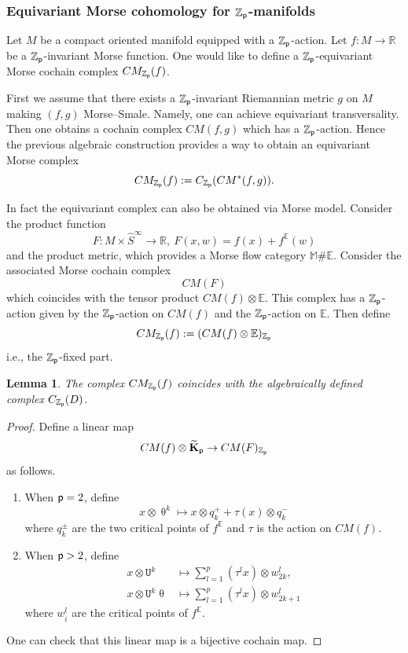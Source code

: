 \documentclass[reqno, 10pt]{amsart}
\numberwithin{equation}{section}
\numberwithin{equation}{section}
\newtheorem{lemma}[thm]{Lemma}
\theoremstyle{definition}
\theoremstyle{remark}
\newcommand{\beqn}{\begin{equation*}}
\newcommand{\eeqn}{\end{equation*}}
\newcommand{\mb}{\mathbb}
\newcommand{\p}{{\sf p}}
\newcommand{\tkp}{\wt{\bf K}_{\sf p}}
\newcommand{\zp}{{{\mb Z}_{\sf p}}}
\newcommand{\ep}{{{\mathbb E}}}
\newcommand{\tu}{\mathtt{U}}
\newcommand{\wt}{\widetilde}
\newcommand{\wh}{\widehat}
\begin{document}
\subsubsection{Equivariant Morse cohomology for $\zp$-manifolds}

Let $M$ be a compact oriented manifold equipped with a $\zp$-action. Let $f: M \to {\mb R}$ be a $\zp$-invariant Morse function. One would like to define a $\zp$-equivariant Morse cochain complex $CM_{\zp} (f)$. 

First we assume that there exists a $\zp$-invariant Riemannian metric $g$ on $M$ making $(f, g)$ Morse--Smale. Namely, one can achieve equivariant transversality. Then one obtains a cochain complex $CM (f, g)$ which has a $\zp$-action. Hence the previous algebraic construction provides a way to obtain an equivariant Morse complex
\beqn
CM_{\zp} (f):= C_{\zp} ( CM^*(f, g)).
\eeqn

In fact the equivariant complex can also be obtained via Morse model. Consider the product function
\beqn
F: M \times \wh S^\infty \to {\mb R},\ F(x, w) = f(x) + f^{\mb E}(w)
\eeqn
and the product metric, which provides a Morse flow category ${\mb M}\#\ep$. Consider the associated Morse cochain complex
\beqn
CM (F)
\eeqn
which coincides with the tensor product $CM (f) \otimes {\mb E}$. This complex has a $\zp$-action given by the $\zp$-action on $CM (f)$ and the $\zp$-action on ${\mb E}$. Then define
\beqn
CM_{\zp} (f):= (CM (f) \otimes {\mb E})_{\zp}
\eeqn
i.e., the $\zp$-fixed part. 

\begin{lemma}
The complex $CM_{\zp} (f)$ coincides with the algebraically defined complex $C_{\zp} (D)$.
\end{lemma}

\begin{proof}
Define a linear map
\beqn
CM(f) \otimes \tkp \to CM(F)_{\zp}
\eeqn
as follows.
\begin{enumerate}

\item When $\p = 2$, define 
\beqn
x\otimes \uptheta^k \mapsto x \otimes q_k^+ + \tau(x) \otimes q_k^-
\eeqn
where $q_k^\pm$ are the two critical points of $f^\ep$ and $\tau$ is the action on $CM(f)$.

\item When $\p > 2$, define
\beqn
\begin{split}
    x \otimes \tu^k & \mapsto \sum_{l=1}^{p} (\tau^l x) \otimes w_{2k}^l,\\
    x \otimes \tu^k \uptheta & \mapsto \sum_{l=1}^p (\tau^l x) \otimes w_{2k+1}^l
    \end{split}
\eeqn
where $w_i^l$ are the critical points of $f^\ep$. 
\end{enumerate}
One can check that this linear map is a bijective cochain map.
\end{proof}
\end{document}
